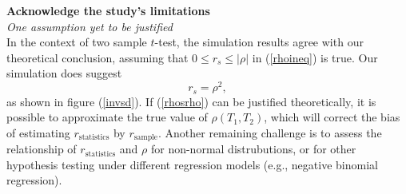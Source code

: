 \documentclass[11pt, a4paper]{article}
\begin{document}
 \textbf{	Acknowledge the study’s limitations \\}
 \textit{One assumption yet to be justified}\\
 In the context of two sample $t$-test, the simulation results agree with our theoretical conclusion, assuming that  $0\leq r_s \leq |\rho|$ in (\ref{rhoineq}) is true. Our simulation does suggest 
 \begin{equation}\label{rhosrho}
 r_s = \rho^2, 
 \end{equation}
 as shown in figure (\ref{invsd}). If (\ref{rhosrho}) can be justified theoretically, it is possible to approximate the true value of $\rho(T_1, T_2)$, which will correct the bias of estimating $r_\text{statistics}$ by $r_\text{sample}$. Another remaining challenge is to assess the relationship of $r_\text{statistics}$  and $\rho$ for non-normal distrubutions, or for other hypothesis testing under different regression models (e.g., negative binomial regression).  
 


\newpage
\end{document}
